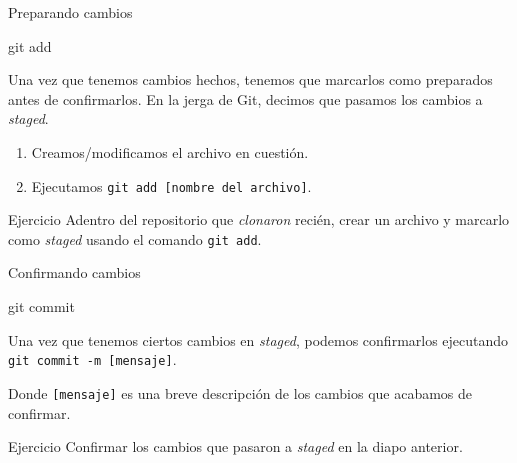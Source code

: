 \begin{frame}[t]{Preparando cambios}
    \begin{comando}
        git add
    \end{comando}

    \pause
    \begin{block}{}
        Una vez que tenemos cambios hechos, tenemos que marcarlos como preparados antes de confirmarlos. En la jerga de Git, decimos que pasamos los cambios a \textit{staged}.
        \begin{enumerate}
            \item Creamos/modificamos el archivo en cuestión.
            \item Ejecutamos \texttt{git add [nombre del archivo]}.
        \end{enumerate}
    \end{block}

    \pause
    \vspace{1em}
    \begin{ejercicio}{Ejercicio}
        Adentro del repositorio que \textit{clonaron} recién, crear un archivo y
        marcarlo como \textit{staged} usando el comando \texttt{git add}.
    \end{ejercicio}
\end{frame}

\begin{frame}[t]{Confirmando cambios}
    \begin{comando}
        git commit
    \end{comando}

    \pause
    \begin{block}{}
        Una vez que tenemos ciertos cambios en \textit{staged}, podemos confirmarlos
        ejecutando \texttt{git commit -m [mensaje]}.

        \vspace{0.5em}

        Donde \texttt{[mensaje]} es una breve descripción de los cambios que acabamos de confirmar.
    \end{block}

    \pause
    \vspace{1em}
    \begin{ejercicio}{Ejercicio}
        Confirmar los cambios que pasaron a \textit{staged} en la diapo anterior.
    \end{ejercicio}
\end{frame}


